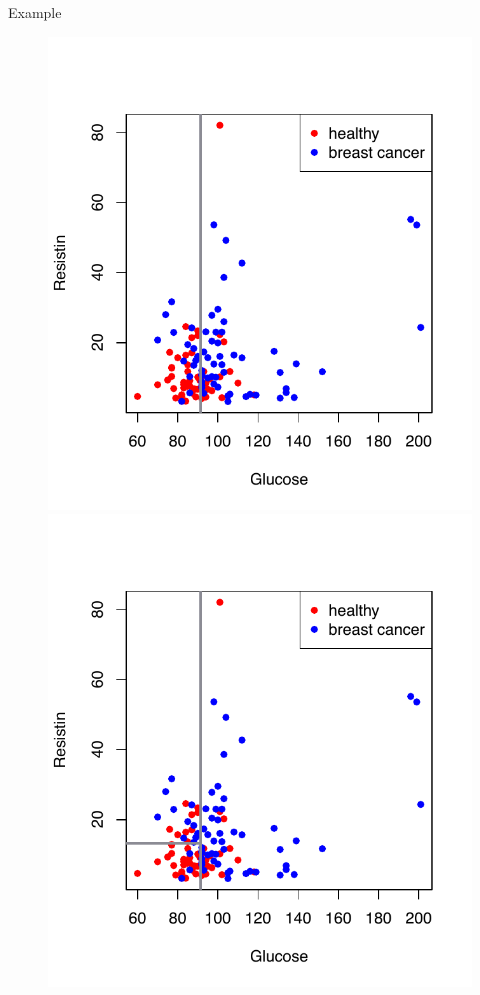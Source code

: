\documentclass[notes]{beamer}          %
\begin{document}
\begin{frame}{Example}
 \begin{figure}
  \includegraphics[width=\linewidth]{../figures/week_6/breast_cancer_2Dscatterplot_vline.pdf}  
\endminipage\hfill
{}%
  \includegraphics[width=\linewidth]{../figures/week_6/breast_cancer_2Dscatterplot_vhlines.pdf}  
\endminipage
\end{figure}
\end{frame}
\end{document}
